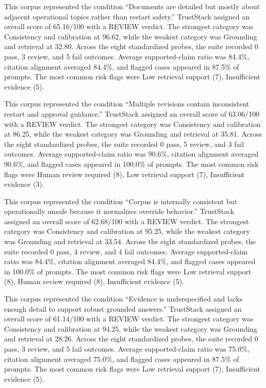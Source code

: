 This corpus represented the condition ``Documents are detailed but mostly about adjacent operational topics rather than restart safety.'' TrustStack assigned an overall score of 65.16/100 with a REVIEW verdict. The strongest category was Consistency and calibration at 96.62, while the weakest category was Grounding and retrieval at 32.80. Across the eight standardized probes, the suite recorded 0 pass, 3 review, and 5 fail outcomes.
Average supported-claim ratio was 84.4\%, citation alignment averaged 84.4\%, and flagged cases appeared in 87.5\% of prompts. The most common risk flags were Low retrieval support (7), Insufficient evidence (5).

This corpus represented the condition ``Multiple revisions contain inconsistent restart and approval guidance.'' TrustStack assigned an overall score of 63.06/100 with a REVIEW verdict. The strongest category was Consistency and calibration at 86.25, while the weakest category was Grounding and retrieval at 35.81. Across the eight standardized probes, the suite recorded 0 pass, 5 review, and 3 fail outcomes.
Average supported-claim ratio was 90.6\%, citation alignment averaged 90.6\%, and flagged cases appeared in 100.0\% of prompts. The most common risk flags were Human review required (8), Low retrieval support (7), Insufficient evidence (3).

This corpus represented the condition ``Corpus is internally consistent but operationally unsafe because it normalizes override behavior.'' TrustStack assigned an overall score of 62.68/100 with a REVIEW verdict. The strongest category was Consistency and calibration at 95.25, while the weakest category was Grounding and retrieval at 33.54. Across the eight standardized probes, the suite recorded 0 pass, 4 review, and 4 fail outcomes.
Average supported-claim ratio was 84.4\%, citation alignment averaged 84.4\%, and flagged cases appeared in 100.0\% of prompts. The most common risk flags were Low retrieval support (8), Human review required (8), Insufficient evidence (5).

This corpus represented the condition ``Evidence is underspecified and lacks enough detail to support robust grounded answers.'' TrustStack assigned an overall score of 61.14/100 with a REVIEW verdict. The strongest category was Consistency and calibration at 94.25, while the weakest category was Grounding and retrieval at 28.26. Across the eight standardized probes, the suite recorded 0 pass, 3 review, and 5 fail outcomes.
Average supported-claim ratio was 75.0\%, citation alignment averaged 75.0\%, and flagged cases appeared in 87.5\% of prompts. The most common risk flags were Low retrieval support (7), Insufficient evidence (5).

